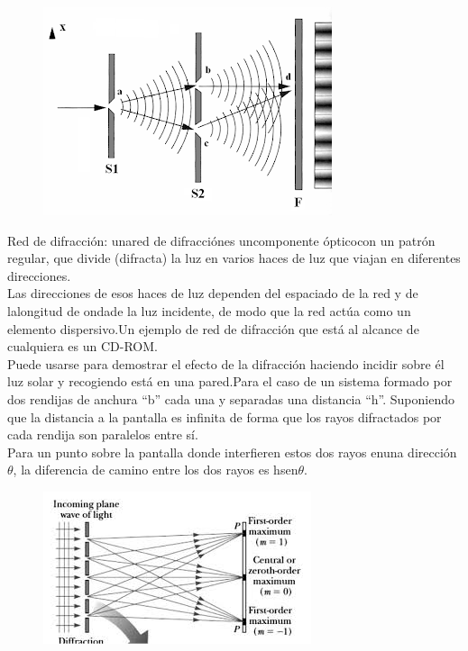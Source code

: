 \documentclass[13,twocolumn,letterpaper]{article}
\begin{document}
 \begin{figure}[h]
	\centering
\includegraphics[width=\linewidth]{Fig91.png}
	\label{fig:fig3}
\end{figure}
 
 Red  de  difracción: unared  de  difracciónes  uncomponente  ópticocon  un  patrón regular, que divide (difracta) la luz en varios haces de luz que viajan en diferentes direcciones.\\
 
 Las direcciones de esos haces de luz dependen del espaciado de la red y de lalongitud de ondade la luz incidente, de modo que la red actúa como un elemento dispersivo.Un ejemplo de red de difracción que está al alcance de cualquiera es un CD-ROM. \\
 
 Puede usarse para demostrar el efecto de la difracción haciendo incidir sobre él luz solar y recogiendo está en una pared.Para el caso de un sistema formado por dos rendijas de anchura “b” cada una y separadas una distancia “h”. Suponiendo que la distancia a la pantalla es infinita de forma que los rayos difractados por cada rendija son paralelos entre sí.\\ 
 
 Para  un  punto  sobre  la  pantalla  donde  interfieren  estos  dos  rayos  enuna dirección $\theta$, la diferencia de camino entre los dos rayos es hsen$\theta$.\\


\begin{figure}[h]
	\centering
\includegraphics[width=\linewidth]{figgg.jpg}
	\label{fig:fig4}
\end{figure}
\end{document}
